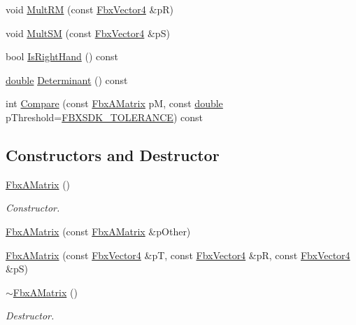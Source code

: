 \begin{DoxyCompactItemize}
\item 
void \hyperlink{class_fbx_a_matrix_a74b163f39e346d5dedfd4d56f9624353}{Mult\+RM} (const \hyperlink{class_fbx_vector4}{Fbx\+Vector4} \&pR)
\item 
void \hyperlink{class_fbx_a_matrix_a96ecf0c5a8772ebdcc7f13b54651b3ed}{Mult\+SM} (const \hyperlink{class_fbx_vector4}{Fbx\+Vector4} \&pS)
\item 
bool \hyperlink{class_fbx_a_matrix_a9cdf7165572983d917a8e59577c3a55a}{Is\+Right\+Hand} () const
\item 
\hyperlink{class_fbx_a_matrix_ad463edbb9fea344643297701f159faa7}{double} \hyperlink{class_fbx_a_matrix_a4aa7cbe3d389f1d2cbdfbbf2de032192}{Determinant} () const
\item 
int \hyperlink{class_fbx_a_matrix_a9ffb29a163216aa93b36c29e143f08f8}{Compare} (const \hyperlink{class_fbx_a_matrix}{Fbx\+A\+Matrix} pM, const \hyperlink{class_fbx_a_matrix_ad463edbb9fea344643297701f159faa7}{double} p\+Threshold=\hyperlink{fbxtypes_8h_acf3cd6f208edb42ad9c9abbc1f7feea0}{F\+B\+X\+S\+D\+K\+\_\+\+T\+O\+L\+E\+R\+A\+N\+CE}) const
\end{DoxyCompactItemize}
\subsection*{Constructors and Destructor}
\begin{DoxyCompactItemize}
\item 
\hyperlink{class_fbx_a_matrix_afde94bf7fa3e5a001cf8c0733aab69ea}{Fbx\+A\+Matrix} ()
\begin{DoxyCompactList}\small\item\em Constructor. \end{DoxyCompactList}\item 
\hyperlink{class_fbx_a_matrix_a610a8cdf2f914285630decbf576d77ab}{Fbx\+A\+Matrix} (const \hyperlink{class_fbx_a_matrix}{Fbx\+A\+Matrix} \&p\+Other)
\item 
\hyperlink{class_fbx_a_matrix_a0771e5745b856c562c6415d83e331d15}{Fbx\+A\+Matrix} (const \hyperlink{class_fbx_vector4}{Fbx\+Vector4} \&pT, const \hyperlink{class_fbx_vector4}{Fbx\+Vector4} \&pR, const \hyperlink{class_fbx_vector4}{Fbx\+Vector4} \&pS)
\item 
\hyperlink{class_fbx_a_matrix_a9962c1e649b3e203ade001feecb5f922}{$\sim$\+Fbx\+A\+Matrix} ()
\begin{DoxyCompactList}\small\item\em Destructor. \end{DoxyCompactList}\end{DoxyCompactItemize}
